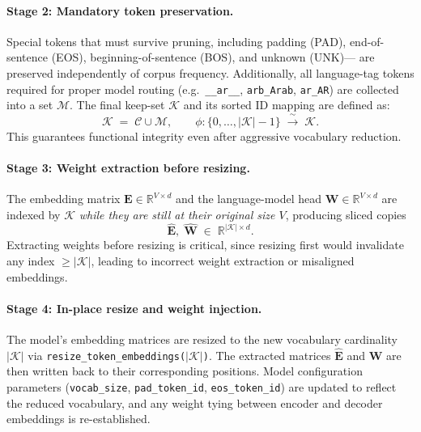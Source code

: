 \documentclass{article}
\begin{document}
	\paragraph{Stage 2: Mandatory token preservation.}
	Special tokens that must survive pruning, including padding (PAD), end-of-sentence (EOS),
	beginning-of-sentence (BOS), and unknown (UNK)--- are preserved independently of corpus
	frequency. Additionally, all language-tag tokens required for proper model routing (e.g.\
	\texttt{\_\_ar\_\_}, \texttt{arb\_Arab}, \texttt{ar\_AR}) are collected into a set $\mathcal{M}$. The
	final keep-set $\mathcal{K}$ and its sorted ID mapping are defined as:
	\[
	\mathcal{K} \;=\; \mathcal{C} \cup \mathcal{M},
	\qquad
	\phi : \bigl\{0,\ldots,|\mathcal{K}|-1\bigr\} \;\xrightarrow{\;\sim\;}\; \mathcal{K}.
	\]
	This guarantees functional integrity even after aggressive vocabulary reduction.
	
	\paragraph{Stage 3: Weight extraction before resizing.}
	
	The embedding matrix $\mathbf{E} \in \mathbb{R}^{V \times d}$ and the language-model head
	$\mathbf{W} \in \mathbb{R}^{V \times d}$ are indexed by $\mathcal{K}$ \emph{while they are still at
		their original size $V$}, producing sliced copies
	\[
	\hat{\mathbf{E}},\;\hat{\mathbf{W}} \;\in\; \mathbb{R}^{|\mathcal{K}| \times d}.
	\]
	Extracting weights before resizing is critical, since resizing first would invalidate any index
	$\geq |\mathcal{K}|$, leading to incorrect weight extraction or misaligned embeddings.
	
	\paragraph{Stage 4: In-place resize and weight injection.}
	The model's embedding matrices are resized to the new vocabulary cardinality $|\mathcal{K}|$ via
	\texttt{resize\_token\_embeddings($|\mathcal{K}|$)}. The extracted matrices $\hat{\mathbf{E}}$ and
	$\hat{\mathbf{W}}$ are then written back to their corresponding positions. Model configuration
	parameters (\texttt{vocab\_size}, \texttt{pad\_token\_id}, \texttt{eos\_token\_id}) are updated to
	reflect the reduced vocabulary, and any weight tying between encoder and decoder embeddings
	is re-established.
	
\end{document}
